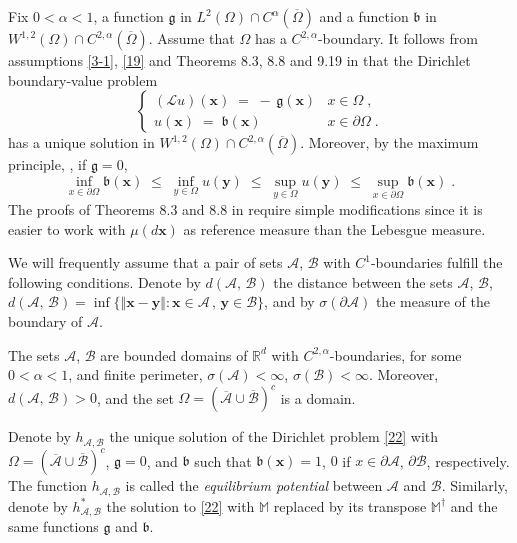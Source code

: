 \documentclass[reqno]{amsart}
\newcounter{as}[section]
\newcommand{\mc}[1]{{\mathcal #1}}
\newcommand{\mf}[1]{{\mathfrak #1}}
\newcommand{\bb}[1]{{\mathbb #1}}
\newcommand{\bs}[1]{{\boldsymbol #1}}
\newcommand{\<}{\langle}
\renewcommand{\>}{\rangle}
\begin{document}
Fix $0<\alpha<1$, a function $\mf g$ in $L^2(\Omega) \cap
C^{\alpha}(\overline{\Omega})$ and a function $\mf b$ in
$W^{1,2}(\Omega)\cap C^{2,\alpha}(\overline{\Omega})$.  Assume that
$\Omega$ has a $C^{2,\alpha}$-boundary.  It follows from assumptions
\eqref{3-1}, \eqref{19} and Theorems 8.3, 8.8 and 9.19 in \cite{gt}
that the Dirichlet boundary-value problem
\begin{equation}
\label{22}
\begin{cases}
(\mathcal L u) (\bs{x}) \;=\; -\, \mf g(\bs{x}) &  x\in \Omega \;, \\
u (\bs{x}) \;=\; \mf b(\bs{x}) &   x\in \partial \Omega \;.
\end{cases}
\end{equation}
has a unique solution in $W^{1,2}(\Omega)\cap
C^{2,\alpha}(\overline{\Omega})$. Moreover, by the maximum principle,
\cite[Theorem~8.1]{gt}, if $\mf g =0$,
\begin{equation}
\label{25}
\inf_{x\in \partial \Omega} \mf b(\bs{x}) \;\le\;
\inf_{y \in \Omega} u(\bs{y}) \;\le\;
\sup_{y \in \Omega} u(\bs{y}) \;\le\;
\sup_{x \in \partial \Omega} \mf b (\bs{x}) \;.
\end{equation}
The proofs of Theorems 8.3 and 8.8 in \cite{gt} require simple
modifications since it is easier to work with $\mu(d\bs{x})$ as reference
measure than the Lebesgue measure.

\smallskip{}
We will frequently assume that a pair of sets $\mc A$, $\mc B$ with
$C^1$-boundaries fulfill the following conditions. Denote by $d(\mc A,\,\mc B)$
the distance between the sets $\mc A$, $\mc B$, $d(\mc A,\,\mc B) = \inf\{\Vert \bs x-\bs y\Vert
: \bs x\in \mc A \,,\, \bs y\in \mc B\}$, and by $\sigma (\partial \mc A)$ the measure of
the boundary of $\mc A$.

\smallskip
{} The sets $\mc A$, $\mc B$ are bounded domains
of $\bb R^d$ with $C^{2,\alpha}$-boundaries, for some $0<\alpha<1$,
and finite perimeter, $\sigma(\mc A)<\infty$,
$\sigma(\mc B)<\infty$. Moreover, $d(\mc A,\,\mc B)>0$, and the set $\Omega =
(\overline{\mc A}\cup \overline{\mc B})^c$ is a domain. \smallskip

Denote by $h_{\mc A,\mc B}$ the unique solution of the Dirichlet
problem \eqref{22} with $\Omega = (\overline{\mc A}\cup \overline{\mc
  B})^c$, $\mf g=0$, and $\mf b$ such that $\mf b (\bs{x}) = 1$, $0$
if $x\in \partial \mc A$, $\partial \mc B$, respectively. The function
$h_{\mc A,\mc B}$ is called the {\sl equilibrium potential} between
$\mc A$ and $\mc B$.  Similarly, denote by $h^*_{\mc A,\mc B}$ the
solution to \eqref{22} with $\bb M$ replaced by its transpose $\bb
M^\dagger$ and the same functions $\mf g$ and $\mf b$.
\end{document}
